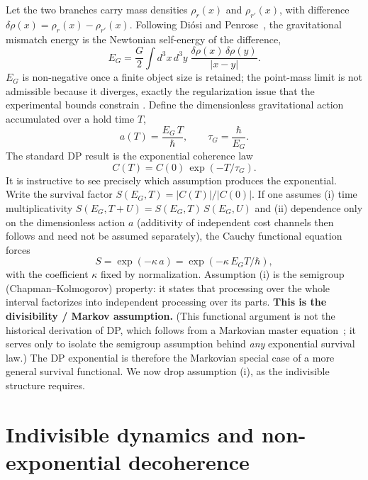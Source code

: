 \documentclass[aps,prd,onecolumn,amsmath,amssymb,nofootinbib,superscriptaddress]{revtex4-2}
\begin{document}
Let the two branches carry mass densities $\rho_r(x)$ and $\rho_{r'}(x)$, with difference
$\delta\rho(x)=\rho_r(x)-\rho_{r'}(x)$. Following Di\'osi and Penrose~\cite{R1,R2,R3}, the
gravitational mismatch energy is the Newtonian self-energy of the difference,
\begin{equation}
E_G=\frac{G}{2}\int d^3x\,d^3y\;\frac{\delta\rho(x)\,\delta\rho(y)}{|x-y|}.
\end{equation}
$E_G$ is non-negative once a finite object size is retained; the point-mass limit is not admissible
because it diverges, exactly the regularization issue that the experimental bounds constrain
\cite{R8}. Define the dimensionless gravitational action accumulated over a hold time $T$,
\begin{equation}
a(T)=\frac{E_G\,T}{\hbar},\qquad \tau_G=\frac{\hbar}{E_G}.
\end{equation}
The standard DP result is the exponential coherence law
\begin{equation}
C(T)=C(0)\,\exp(-T/\tau_G).
\end{equation}
It is instructive to see precisely which assumption produces the exponential. Write the survival
factor $S(E_G,T)=|C(T)|/|C(0)|$. If one assumes (i) time multiplicativity $S(E_G,T+U)=S(E_G,T)\,
S(E_G,U)$ and (ii) dependence only on the dimensionless action $a$ (additivity of independent cost
channels then follows and need not be assumed separately), the Cauchy functional equation forces
\begin{equation}
S=\exp(-\kappa\,a)=\exp(-\kappa\,E_G T/\hbar),
\end{equation}
with the coefficient $\kappa$ fixed by normalization. Assumption (i) is the semigroup
(Chapman--Kolmogorov) property: it states that processing over the whole interval factorizes into
independent processing over its parts. \textbf{This is the divisibility / Markov assumption.} (This
functional argument is not the historical derivation of DP, which follows from a Markovian master
equation~\cite{R2,R20}; it serves only to isolate the semigroup assumption behind \emph{any}
exponential survival law.) The DP exponential is therefore the Markovian special case of a more
general survival functional. We now drop assumption (i), as the indivisible structure requires.

\section{Indivisible dynamics and non-exponential decoherence}\label{sec:indiv}
\end{document}
